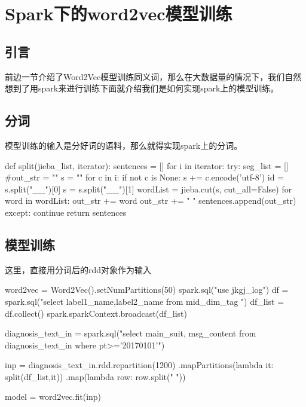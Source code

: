 \chapter{Spark下的word2vec模型训练}

\section{引言}
前边一节介绍了Word2Vec模型训练同义词，那么在大数据量的情况下，我们自然想到了用spark来进行训练下面就介绍我们是如何实现spark上的模型训练。

\section{分词}
模型训练的输入是分好词的语料，那么就得实现spark上的分词。

\begin{python}
def split(jieba_list, iterator):
    sentences = []
    for i in iterator:
        try:
            seg_list = []
            #out_str = ""
            s = ""
            for c in i:
                if not c is None:
                    s += c.encode('utf-8')
            id = s.split("__")[0]
            s = s.split("__")[1]
            wordList = jieba.cut(s, cut_all=False)
            for word in wordList:
	            out_str += word
	            out_str += " "
		        sentences.append(out_str)
        except:
            continue
    return sentences
\end{python}

\section{模型训练}

这里，直接用分词后的rdd对象作为输入

\begin{python}
   word2vec = Word2Vec().setNumPartitions(50)
   spark.sql("use jkgj_log")
   df = spark.sql("select label1_name,label2_name from mid_dim_tag ")
   df_list = df.collect()
   spark.sparkContext.broadcast(df_list)

   diagnosis_text_in = spark.sql("select main_suit,
                        msg_content from diagnosis_text_in where pt>='20170101'")
    
   inp = diagnosis_text_in.rdd.repartition(1200)
        .mapPartitions(lambda it: split(df_list,it))
        .map(lambda row: row.split(" "))

   model = word2vec.fit(inp)
\end{python}